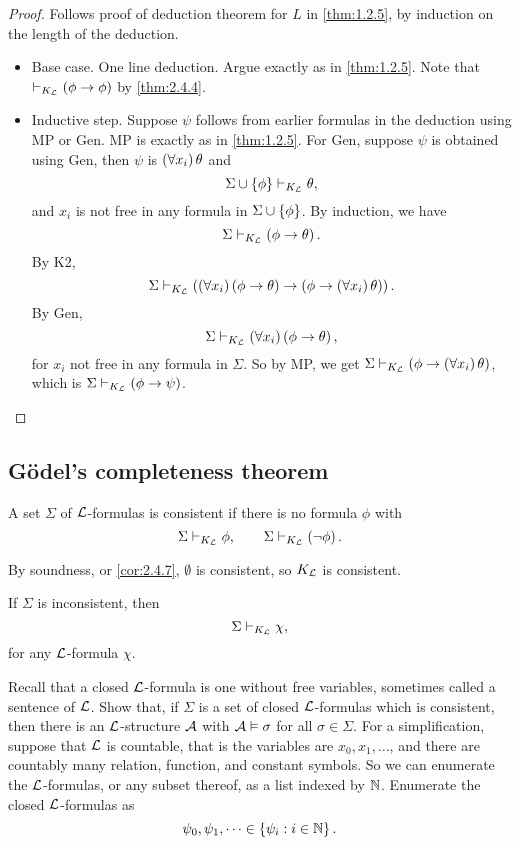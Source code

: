\begin{proof}
Follows proof of deduction theorem for $ L $ in \ref{thm:1.2.5}, by induction on the length of the deduction.
\begin{itemize}
\item Base case. One line deduction. Argue exactly as in \ref{thm:1.2.5}. Note that $ \vdash_{K_{\LL}} \impb{\phi}{\phi} $ by \ref{thm:2.4.4}.
\item Inductive step. Suppose $ \psi $ follows from earlier formulas in the deduction using MP or Gen. MP is exactly as in \ref{thm:1.2.5}. For Gen, suppose $ \psi $ is obtained using Gen, then $ \psi $ is $ \fab{x_i}\theta $ and
$$ \Sigma \cup \cb{\phi} \vdash_{K_{\LL}} \theta, $$
and $ x_i $ is not free in any formula in $ \Sigma \cup \cb{\phi} $. By induction, we have
$$ \Sigma \vdash_{K_{\LL}} \impb{\phi}{\theta}. $$
By K2,
$$ \Sigma \vdash_{K_{\LL}} \impb{\fab{x_i}\impb{\phi}{\theta}}{\impb{\phi}{\fab{x_i}\theta}}. $$
By Gen,
$$ \Sigma \vdash_{K_{\LL}} \fab{x_i}\impb{\phi}{\theta}, $$
for $ x_i $ not free in any formula in $ \Sigma $. So by MP, we get $ \Sigma \vdash_{K_{\LL}} \impb{\phi}{\fab{x_i}\theta} $, which is $ \Sigma \vdash_{K_{\LL}} \impb{\phi}{\psi} $.
\end{itemize}
\end{proof}


\subsection{G\"odel's completeness theorem}

\begin{definition}
A set $ \Sigma $ of $ \LL $-formulas is consistent if there is no formula $ \phi $ with
$$ \Sigma \vdash_{K_{\LL}} \phi, \qquad \Sigma \vdash_{K_{\LL}} \notb{\phi}. $$
\end{definition}

By soundness, or \ref{cor:2.4.7}, $ \emptyset $ is consistent, so $ K_{\LL} $ is consistent.

\begin{remark2}
If $ \Sigma $ is inconsistent, then
$$ \Sigma \vdash_{K_{\LL}} \chi, $$
for any $ \LL $-formula $ \chi $.
\end{remark2}

Recall that a closed $ \LL $-formula is one without free variables, sometimes called a sentence of $ \LL $. Show that, if $ \Sigma $ is a set of closed $ \LL $-formulas which is consistent, then there is an $ \LL $-structure $ \AA $ with $ \AA \vDash \sigma $ for all $ \sigma \in \Sigma $. For a simplification, suppose that $ \LL $ is countable, that is the variables are $ x_0, x_1, \dots $, and there are countably many relation, function, and constant symbols. So we can enumerate the $ \LL $-formulas, or any subset thereof, as a list indexed by $ \N $. Enumerate the closed $ \LL $-formulas as
$$ \psi_0, \psi_1, \dots \in \cb{\psi_i : i \in \N}. $$


